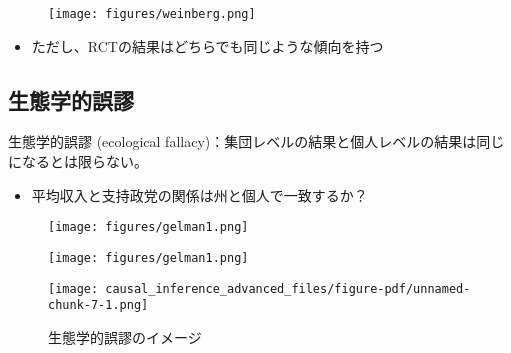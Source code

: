 \documentclass[
  xelatex,
  ja=standard]{bxjsarticle}
\providecommand{\tightlist}{%
  \setlength{\itemsep}{0pt}\setlength{\parskip}{0pt}}\usepackage{longtable,booktabs,array}
\begin{document}
\begin{figure}[htpb]

{\centering \texttt{[image: figures/weinberg.png]}

}

\caption{\citet{weinberg2014}}

\end{figure}

\begin{itemize}
\tightlist
\item
  ただし、RCTの結果はどちらでも同じような傾向を持つ\citep{weinberg2014}
\end{itemize}

\hypertarget{ux751fux614bux5b66ux7684ux8aa4ux8b2c}{%
\subsection{生態学的誤謬}\label{ux751fux614bux5b66ux7684ux8aa4ux8b2c}}

生態学的誤謬 (ecological
fallacy)：集団レベルの結果と個人レベルの結果は同じになるとは限らない。

\begin{itemize}
\tightlist
\item
  平均収入と支持政党の関係は州と個人で一致するか？\citep{gelman2007}
\end{itemize}

\begin{figure}[htpb]

{\centering \texttt{[image: figures/gelman1.png]}

}

\caption{\citet{gelman2007}}

\end{figure}

\begin{figure}[htpb]

{\centering \texttt{[image: figures/gelman1.png]}

}

\caption{\citet{gelman2007}}

\end{figure}

\begin{figure}[htpb]

{\centering \texttt{[image: causal\_inference\_advanced\_files/figure-pdf/unnamed-chunk-7-1.png]}

}

\caption{生態学的誤謬のイメージ}

\end{figure}
\end{document}
